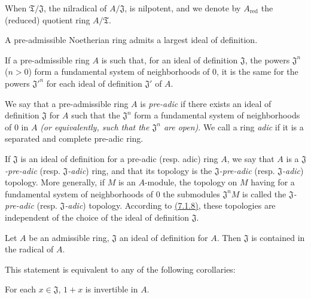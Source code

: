 When $\mathfrak{T}/\mathfrak{J}$, the nilradical of $A/\mathfrak{J}$, is
nilpotent, and we denote by $A_\text{red}$ the (reduced) quotient ring
$A/\mathfrak{T}$.

\begin{cor}[7.1.7]
\label{cor-0.7.1.7}
A pre-admissible Noetherian ring admits a largest ideal of definition.
\end{cor}

\begin{cor}[7.1.8]
\label{cor-0.7.1.8}
If a pre-admissible ring $A$ is such that, for an ideal of definition
$\mathfrak{J}$, the powers $\mathfrak{J}^n$ ($n>0$) form a fundamental system
of neighborhoods of $0$, it is the same for the powers ${\mathfrak{J}'}^n$ for
each ideal of definition $\mathfrak{J}'$ of $A$.
\end{cor}

\begin{defn}[7.1.9]
\label{defn-0.7.1.9}
We say that a pre-admissible ring $A$ is {\em pre-adic} if there exists an
ideal of definition $\mathfrak{J}$ for $A$ such that the $\mathfrak{J}^n$ form
a fundamental system of neighborhoods of $0$ in $A$ {\em (or equivalently, such
that the $\mathfrak{J}^n$ are {\em open})}. We call a ring {\em adic} if it
is a separated and complete pre-adic ring.
\end{defn}

If $\mathfrak{J}$ is an ideal of definition for a pre-adic (resp. adic) ring
$A$, we say that $A$ is a {\em $\mathfrak{J}$-pre-adic}
(resp. {\em $\mathfrak{J}$-adic}) ring, and that its topology is the
{\em $\mathfrak{J}$-pre-adic} (resp. {\em $\mathfrak{J}$-adic}) topology. More
generally, if $M$ is an $A$-module, the topology on $M$ having for a fundamental
system of neighborhoods of $0$ the submodules $\mathfrak{J}^n M$ is called the
{\em $\mathfrak{J}$-pre-adic} (resp. {\em $\mathfrak{J}$-adic}) topology.
According to \hyperref[cor-0.7.1.8]{(7.1.8)}, these topologies are independent of the choice
of the ideal of definition $\mathfrak{J}$.

\begin{prop}[7.1.10]
\label{prop-0.7.1.10}
Let $A$ be an admissible ring, $\mathfrak{J}$ an ideal of definition for $A$.
Then $\mathfrak{J}$ is contained in the radical of $A$.
\end{prop}

This statement is equivalent to any of the following corollaries:
\begin{cor}[7.1.11]
\label{cor-0.7.1.11}
For each $x\in\mathfrak{J}$, $1+x$ is invertible in $A$.
\end{cor}

